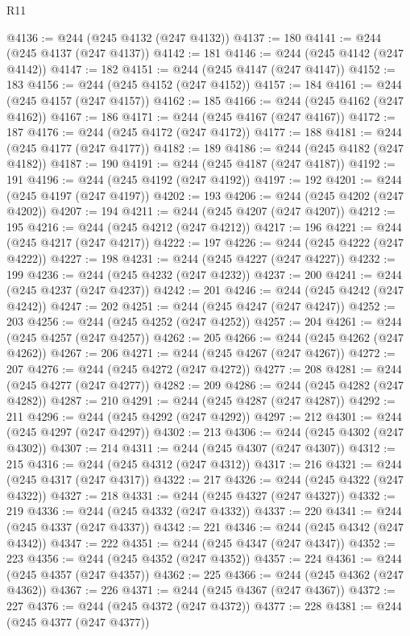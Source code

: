 \begin{lexlean}{R11}
\begin{coremodule}
@4136 := @244 (@245 @4132 (@247 @4132))
@4137 := 180
@4141 := @244 (@245 @4137 (@247 @4137))
@4142 := 181
@4146 := @244 (@245 @4142 (@247 @4142))
@4147 := 182
@4151 := @244 (@245 @4147 (@247 @4147))
@4152 := 183
@4156 := @244 (@245 @4152 (@247 @4152))
@4157 := 184
@4161 := @244 (@245 @4157 (@247 @4157))
@4162 := 185
@4166 := @244 (@245 @4162 (@247 @4162))
@4167 := 186
@4171 := @244 (@245 @4167 (@247 @4167))
@4172 := 187
@4176 := @244 (@245 @4172 (@247 @4172))
@4177 := 188
@4181 := @244 (@245 @4177 (@247 @4177))
@4182 := 189
@4186 := @244 (@245 @4182 (@247 @4182))
@4187 := 190
@4191 := @244 (@245 @4187 (@247 @4187))
@4192 := 191
@4196 := @244 (@245 @4192 (@247 @4192))
@4197 := 192
@4201 := @244 (@245 @4197 (@247 @4197))
@4202 := 193
@4206 := @244 (@245 @4202 (@247 @4202))
@4207 := 194
@4211 := @244 (@245 @4207 (@247 @4207))
@4212 := 195
@4216 := @244 (@245 @4212 (@247 @4212))
@4217 := 196
@4221 := @244 (@245 @4217 (@247 @4217))
@4222 := 197
@4226 := @244 (@245 @4222 (@247 @4222))
@4227 := 198
@4231 := @244 (@245 @4227 (@247 @4227))
@4232 := 199
@4236 := @244 (@245 @4232 (@247 @4232))
@4237 := 200
@4241 := @244 (@245 @4237 (@247 @4237))
@4242 := 201
@4246 := @244 (@245 @4242 (@247 @4242))
@4247 := 202
@4251 := @244 (@245 @4247 (@247 @4247))
@4252 := 203
@4256 := @244 (@245 @4252 (@247 @4252))
@4257 := 204
@4261 := @244 (@245 @4257 (@247 @4257))
@4262 := 205
@4266 := @244 (@245 @4262 (@247 @4262))
@4267 := 206
@4271 := @244 (@245 @4267 (@247 @4267))
@4272 := 207
@4276 := @244 (@245 @4272 (@247 @4272))
@4277 := 208
@4281 := @244 (@245 @4277 (@247 @4277))
@4282 := 209
@4286 := @244 (@245 @4282 (@247 @4282))
@4287 := 210
@4291 := @244 (@245 @4287 (@247 @4287))
@4292 := 211
@4296 := @244 (@245 @4292 (@247 @4292))
@4297 := 212
@4301 := @244 (@245 @4297 (@247 @4297))
@4302 := 213
@4306 := @244 (@245 @4302 (@247 @4302))
@4307 := 214
@4311 := @244 (@245 @4307 (@247 @4307))
@4312 := 215
@4316 := @244 (@245 @4312 (@247 @4312))
@4317 := 216
@4321 := @244 (@245 @4317 (@247 @4317))
@4322 := 217
@4326 := @244 (@245 @4322 (@247 @4322))
@4327 := 218
@4331 := @244 (@245 @4327 (@247 @4327))
@4332 := 219
@4336 := @244 (@245 @4332 (@247 @4332))
@4337 := 220
@4341 := @244 (@245 @4337 (@247 @4337))
@4342 := 221
@4346 := @244 (@245 @4342 (@247 @4342))
@4347 := 222
@4351 := @244 (@245 @4347 (@247 @4347))
@4352 := 223
@4356 := @244 (@245 @4352 (@247 @4352))
@4357 := 224
@4361 := @244 (@245 @4357 (@247 @4357))
@4362 := 225
@4366 := @244 (@245 @4362 (@247 @4362))
@4367 := 226
@4371 := @244 (@245 @4367 (@247 @4367))
@4372 := 227
@4376 := @244 (@245 @4372 (@247 @4372))
@4377 := 228
@4381 := @244 (@245 @4377 (@247 @4377))

\end{coremodule}
\end{lexlean}
